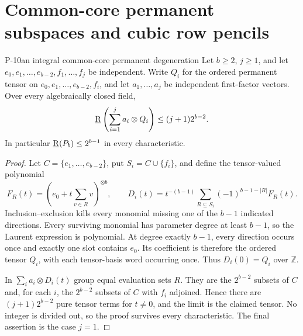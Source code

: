 \section{Common-core permanent subspaces and cubic row pencils}

\begin{finding}{P-10}{an integral common-core permanent degeneration}
Let $b\geq2$, $j\geq1$, and let
$e_0,e_1,\ldots,e_{b-2},f_1,\ldots,f_j$ be independent.
Write $Q_i$ for the ordered permanent tensor on
$e_0,e_1,\ldots,e_{b-2},f_i$, and let $a_1,\ldots,a_j$
be independent first-factor vectors. Over every algebraically
closed field,
\[
 \underline{\mathrm R}\left(\sum_{i=1}^j a_i\otimes Q_i\right)
 \leq (j+1)2^{b-2}.
\]
In particular $\underline{\mathrm R}(P_b)\leq2^{b-1}$ in every characteristic.
\end{finding}
\begin{proof}
Let $C=\{e_1,\ldots,e_{b-2}\}$, put $S_i=C\cup\{f_i\}$,
and define the tensor-valued polynomial
\[
 F_R(t)=\left(e_0+t\sum_{v\in R}v\right)^{\otimes b},
 \qquad
 D_i(t)=t^{-(b-1)}\sum_{R\subseteq S_i}
                 (-1)^{b-1-|R|}F_R(t).
\]
Inclusion--exclusion kills every monomial missing one
of the $b-1$ indicated directions. Every surviving
monomial has parameter degree at least $b-1$, so the
Laurent expression is polynomial. At degree exactly
$b-1$, every direction occurs once and exactly one
slot contains $e_0$. Its coefficient is therefore
the ordered tensor $Q_i$, with each tensor-basis word
occurring once. Thus $D_i(0)=Q_i$ over $\mathbb Z$.

In $\sum_i a_i\otimes D_i(t)$ group equal evaluation
sets $R$. They are the $2^{b-2}$ subsets of $C$ and,
for each $i$, the $2^{b-2}$ subsets of $C$ with $f_i$
adjoined. Hence there are $(j+1)2^{b-2}$ pure tensor
terms for $t\ne0$, and the limit is the claimed tensor.
No integer is divided out, so the proof survives every
characteristic. The final assertion is the case $j=1$.
\end{proof}

